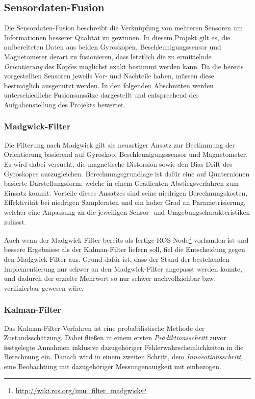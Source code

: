 \subsection{Sensordaten-Fusion}
\label{headtracking_fusion_subsec}
Die Sensordaten-Fusion beschreibt die Verknüpfung von mehreren Sensoren um Informationen besserer Qualität zu gewinnen.
In diesem Projekt gilt es, die aufbereiteten Daten aus beiden Gyroskopen, Beschleunigungssensor und Magnetometer derart zu fusionieren, dass letztlich die zu ermittelnde \emph{Orientierung} des Kopfes möglichst exakt bestimmt werden kann.
Da die bereits vorgestellten Sensoren jeweils Vor- und Nachteile haben, müssen diese bestmöglich ausgenutzt werden.
In den folgenden Abschnitten werden unterschiedliche Fusionsansätze dargestellt und entsprechend der Aufgabenstellung des Projekts bewertet. 

\subsubsection{Madgwick-Filter}
Die Filterung nach Madgwick \cite{madgwick2010efficient} gilt als neuartiger Ansatz zur Bestimmung der Orientierung basierend auf Gyroskop, Beschleunigungssensor und Magnetometer.
Es wird dabei versucht, die magnetische Distorsion sowie den Bias-Drift des Gyroskopes auszugleichen.
Berechnungsgrundlage ist dafür eine auf Quaternionen basierte Darstellungsform, welche in einem Gradienten-Abstiegsverfahren zum Einsatz kommt.
Vorteile dieses Ansatzes sind seine niedrigen Berechnungskosten, Effektivität bei niedrigen Sampleraten und ein hoher Grad an Parametrisierung, welcher eine Anpassung an die jeweiligen Sensor- und Umgebungscharakteristiken zulässt.

Auch wenn der Madgwick-Filter bereits als fertige \ac{ROS}-Node\footnote{\url{http://wiki.ros.org/imu_filter_madgwick}} vorhanden ist und bessere Ergebnisse als der Kalman-Filter liefern soll, fiel die Entscheidung gegen den Madgwick-Filter aus.
Grund dafür ist, dass der Stand der bestehenden Implementierung nur schwer an den Madgwick-Filter angepasst werden konnte, und dadurch der erzielte Mehrwert so nur schwer nachvollziehbar bzw. verifizierbar gewesen wäre. 

\subsubsection{Kalman-Filter}
Das Kalman-Filter-Verfahren \cite{kalman1960new} ist eine probabilistische Methode der Zustandsschätzung.
Dabei fließen in einem ersten \emph{Prädiktionsschritt} zuvor festgelegte Annahmen inklusive dazugehöriger Fehlerwahrscheinlichkeiten in die Berechnung ein.
Danach wird in einem zweiten Schritt, dem \emph{Innovationsschritt}, eine Beobachtung mit dazugehöriger Messungenauigkeit mit einbezogen.

